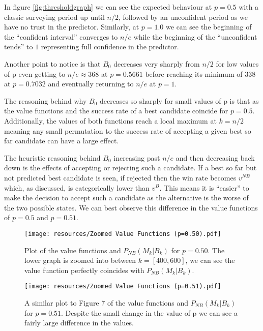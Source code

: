\documentclass[a4paper,11pt]{article}
\begin{document}
In figure \ref{fig:thresholdgraph} we can see the expected behaviour at $p = 0.5$ with a classic surveying period up until $n/2$, followed by an unconfident period as we have no trust in the predictor. Similarly, at $p = 1.0$ we can see the beginning of the ``confident interval'' converges to $n/e$ while the beginning of the ``unconfident tends'' to $1$ representing full confidence in the predictor.

Another point to notice is that $B_0$ decreases very sharply from $n/2$ for low values of p even getting to $n/e\approx368$ at $p = 0.5661$ before reaching its minimum of $338$ at $p=0.7032$ and eventually returning to $n/e$ at $p=1$.

The reasoning behind why $B_0$ decreases so sharply for small values of p is that as the value functions and the success rate of a best candidate coincide for $p=0.5$. Additionally, the values of both functions reach a local maximum at $k = n/2$ meaning any small permutation to the success rate of accepting a given best so far candidate can have a large effect.

The heuristic reasoning behind $B_0$ increasing past $n/e$ and then decreasing back down is the effects of accepting or rejecting such a candidate. If a best so far but not predicted best candidate is seen, if rejected then the win rate becomes $v^{NB}$ which, as discussed, is categorically lower than $v^B$. This means it is ``easier'' to make the decision  to accept such a candidate as the alternative is the worse of the two possible states. We can best observe this difference in the value functions of $p=0.5$ and $p=0.51$.

\begin{figure}[H]
    \centering
    \texttt{[image: resources/Zoomed Value Functions (p=0.50).pdf]}
    \caption{Plot of the value functions and $P_{NB}(M_k | B_k)$ for $p=0.50$. The lower graph is zoomed into between $k = [400,600]$, we can see the value function perfectly coincides with $P_{NB}(M_k|B_k)$. }    \label{fig:vector_plotp=0.50}
\end{figure}

\begin{figure}[H]
    \centering
    \texttt{[image: resources/Zoomed Value Functions (p=0.51).pdf]}
    \caption{A similar plot to Figure 7 of the value functions and $P_{NB}(M_k | B_k)$ for $p=0.51$. Despite the small change in the value of p we can see a fairly large difference in the values.}
    \label{fig:vector_plotp=0.51}
\end{figure}
\end{document}
